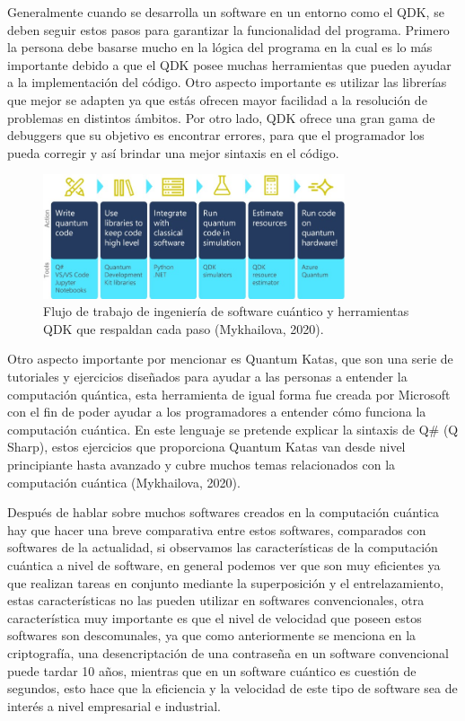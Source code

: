 \documentclass[twoside]{article}
\begin{document}
Generalmente cuando se desarrolla un software en un entorno como el QDK, se deben seguir estos pasos para garantizar la funcionalidad del programa. Primero la persona debe basarse mucho en la lógica del programa en la cual es lo más importante debido a que el QDK posee muchas herramientas que pueden ayudar a la implementación del código. Otro aspecto importante es utilizar las librerías que mejor se adapten ya que estás ofrecen mayor facilidad a la resolución de problemas en distintos ámbitos. Por otro lado, QDK ofrece una gran gama de debuggers que su objetivo es encontrar errores, para que el programador los pueda corregir y así brindar una mejor sintaxis en el código.  


\begin{figure}[htb]
    \centering
    \includegraphics[width=3.5in]{Images/QDK.jpg}
    \caption{Flujo de trabajo de ingeniería de software cuántico y herramientas QDK que respaldan cada paso (Mykhailova, 2020).}
    \label{fig:quantum}
\end{figure}

Otro aspecto importante por mencionar es Quantum Katas, que son una serie de tutoriales y ejercicios diseñados para ayudar a las personas a entender la computación quántica, esta herramienta de igual forma fue creada por Microsoft con el fin de poder ayudar a los programadores a entender cómo funciona la computación cuántica. En este lenguaje se pretende explicar la sintaxis de Q\# (Q Sharp), estos ejercicios que proporciona Quantum Katas van desde nivel principiante hasta avanzado y cubre muchos temas relacionados con la computación cuántica (Mykhailova, 2020).

Después de hablar sobre muchos softwares creados en la computación cuántica hay que hacer una breve comparativa entre estos softwares, comparados con softwares de la actualidad, si observamos las características de la computación cuántica a nivel de software, en general podemos ver que son muy eficientes ya que realizan tareas en conjunto mediante la superposición y el entrelazamiento, estas características no las pueden utilizar en softwares convencionales, otra característica muy importante es que el nivel de velocidad que poseen estos softwares son descomunales, ya que como anteriormente se menciona en la criptografía, una desencriptación de una contraseña en un software convencional puede tardar 10 años, mientras que en un software cuántico es cuestión de segundos, esto hace que la eficiencia y la velocidad de este tipo de software sea de interés a nivel empresarial e industrial. 
\end{document}
